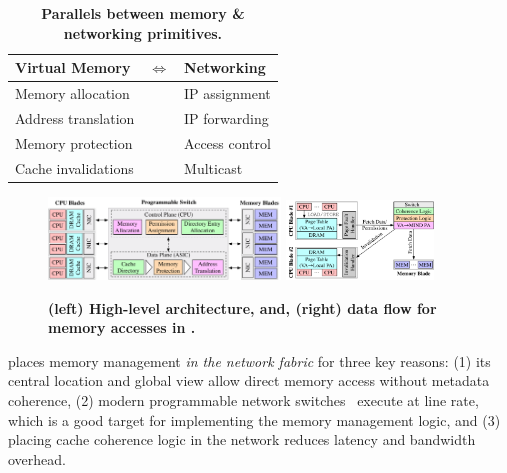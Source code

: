 \begin{table}
    \caption[Parallels between memory \& networking primitives]{\small \textbf{Parallels between memory \& networking primitives.}}
    \label{table:isomorph}
    \centering
    \scriptsize
    \renewcommand{\arraystretch}{1.2}
    \begin{tabular}{p{3cm} p{1cm}p{3cm}}
      \hline
      \textbf{Virtual Memory} &$\Longleftrightarrow$ &\textbf{Networking} \\\hline\hline
      Memory allocation&&IP assignment\\
      Address translation &&IP forwarding\\
      Memory protection  &&Access control\\
      Cache invalidations &&Multicast\\
      \hline
    \end{tabular}
\end{table}


\begin{figure}[!t]
\centering
\includegraphics[width=0.55\textwidth]{fig/mind/design}\hspace{3em}
\includegraphics[width=0.35\textwidth]{fig/mind/data_flow}%
\vspace{-0.5em}
\caption[High-level \mind architecture and data flow for memory accesses in \mind]{\textbf{(left) High-level \mind architecture, and, (right) data flow for memory accesses in \mind.}}
\label{fig:system_diagram}
\end{figure}

\mind places memory management \textit{in the network fabric} for three key reasons: (1) its central location and global view allow direct memory access without metadata coherence, (2) modern programmable network switches~\cite{progswitch1} execute at line rate, which is a good target for implementing the memory management logic, and (3) placing cache coherence logic in the network reduces latency and bandwidth overhead. 

